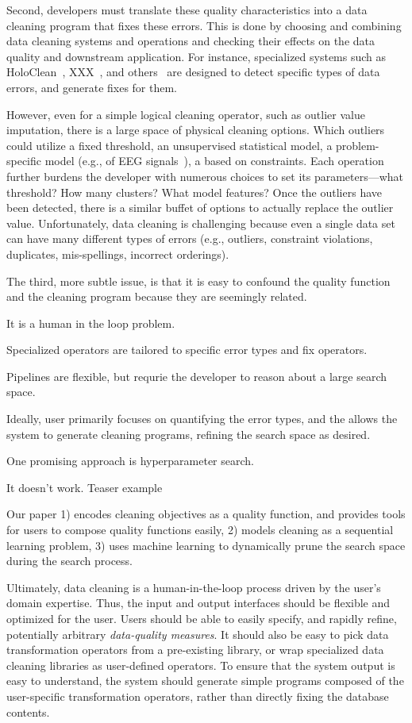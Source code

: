 Second, developers must translate these quality characteristics into a data cleaning program that fixes these errors.  This is done by choosing and combining data cleaning systems and operations and checking their effects on the data quality and downstream application.  For instance, specialized systems such as HoloClean~\cite{}, XXX~\cite{}, and others~\cite{} are designed to detect specific types of data errors, and generate fixes for them.  


However, even for a simple logical cleaning operator, such as outlier value imputation, there is a large space of physical cleaning options.  Which  outliers could utilize a fixed threshold, an unsupervised statistical model, a problem-specific model (e.g., of EEG signals~\cite{}), a based on constraints.  Each operation further burdens the developer with numerous choices to set its parameters---what threshold?  How many clusters? What model features?   Once the outliers have been detected, there is a similar buffet of options to actually replace the outlier value.     Unfortunately, data cleaning is challenging because even a single data set can have many different types of errors (e.g., outliers, constraint violations, duplicates, mis-spellings, incorrect orderings).

The third, more subtle issue, is that it is easy to confound the quality function and the cleaning program because they are seemingly related.  

It is a human in the loop problem.


Specialized operators are tailored to specific error types and fix operators.

Pipelines are flexible, but requrie the developer to reason about a large search space.

Ideally, user primarily focuses on quantifying the error types, and the allows the system to generate cleaning programs, refining the search space as desired.

One promising approach is hyperparameter search.

It doesn't work.  Teaser example

Our paper 1) encodes cleaning objectives as a quality function, and provides tools for users to compose quality functions easily, 2) models cleaning as a sequential learning problem, 3) uses machine learning to dynamically prune the search space during the search process.  



Ultimately, data cleaning is a human-in-the-loop process driven by the user's domain expertise.  Thus, the input and output interfaces should be flexible and optimized for the user.   Users should be able to easily specify, and rapidly refine, potentially arbitrary {\it data-quality measures}.  It should also be easy to pick data transformation operators from a pre-existing library, or wrap specialized data cleaning libraries as user-defined operators.  To ensure that the system output is easy to understand, the system should generate simple programs composed of the user-specific transformation operators, rather than directly fixing the database contents.

